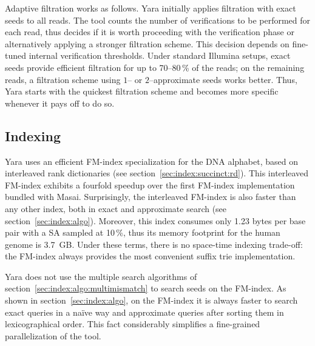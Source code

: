 Adaptive filtration works as follows.
Yara initially applies filtration with exact seeds to all reads.
The tool counts the number of verifications to be performed for each read, thus decides if it is worth proceeding with the verification phase or alternatively applying a stronger filtration scheme.
This decision depends on fine-tuned internal verification thresholds.
Under standard Illumina setups, exact seeds provide efficient filtration for up to 70--80\,\% of the reads; on the remaining reads, a filtration scheme using $1$-- or $2$--approximate seeds works better.
Thus, Yara starts with the quickest filtration scheme and becomes more specific whenever it pays off to do so.


\subsection{Indexing}
\label{sec:yara:eng:indexing}

Yara uses an efficient FM-index specialization for the DNA alphabet, based on interleaved rank dictionaries (see section~\ref{sec:index:succinct:rd}).
This interleaved FM-index exhibits a fourfold speedup over the first FM-index implementation bundled with Masai.
Surprisingly, the interleaved FM-index is also faster than any other index, both in exact and approximate search (see section~\ref{sec:index:algo}).
Moreover, this index consumes only 1.23 bytes per base pair with a SA sampled at 10\,\%, thus its memory footprint for the human genome is 3.7~GB.
Under these terms, there is no space-time indexing trade-off: the FM-index always provides the most convenient suffix trie implementation.

Yara does not use the multiple search algorithms of section~\ref{sec:index:algo:multimismatch} to search seeds on the FM-index.
As shown in section~\ref{sec:index:algo}, on the FM-index it is always faster to search exact queries in a na\"ive way and approximate queries after sorting them in lexicographical order.
This fact considerably simplifies a fine-grained parallelization of the tool.

